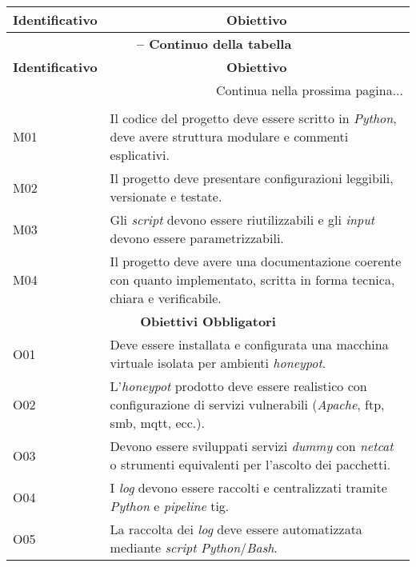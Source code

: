 \begin{center}
\begin{longtable}{|p{}|p{}|}
\hline
\multicolumn{1}{|c|}{\textbf{Identificativo}} & \multicolumn{1}{c|}{\textbf{Obiettivo}}\\ 
\hline 
\endfirsthead
\multicolumn{2}{c}{{\bfseries \tablename\ \thetable{} -- Continuo della tabella}}\\
\hline
\multicolumn{1}{|c|}{\textbf{Identificativo}} & \multicolumn{1}{c|}{\textbf{Obiettivo}}\\ \hline 
\endhead
\hline
\multicolumn{2}{|r|}{{Continua nella prossima pagina...}}\\
\hline
\endfoot
\endlastfoot 

\multicolumn{2}{|c|}{\textbf{Obiettivi Minimi}} \\ \hline
M01 & Il codice del progetto deve essere scritto in \textit{Python}, deve avere struttura modulare e commenti esplicativi. \\ \hline
M02 & Il progetto deve presentare configurazioni leggibili, versionate e testate. \\ \hline
M03 & Gli \textit{script} devono essere riutilizzabili e gli \textit{input} devono essere parametrizzabili. \\ \hline
M04 & Il progetto deve avere una documentazione coerente con quanto implementato, scritta in forma tecnica, chiara e verificabile. \\ \hline

\multicolumn{2}{|c|}{\textbf{Obiettivi Obbligatori}} \\ \hline
O01 & Deve essere installata e configurata una macchina virtuale isolata per ambienti \textit{honeypot}. \\ \hline
O02 & L'\textit{honeypot} prodotto deve essere realistico con configurazione di servizi vulnerabili (\textit{Apache}, \gls{ftp}\glsadd{ftp_def}, \gls{smb}\glsadd{smb_def}, \gls{mqtt}, ecc.). \\ \hline
O03 & Devono essere sviluppati servizi \textit{dummy} con \textit{netcat} o strumenti equivalenti per l'ascolto dei pacchetti. \\ \hline
O04 & I \textit{log} devono essere raccolti e centralizzati tramite \textit{Python} e \textit{pipeline} \gls{tig}. \\ \hline
O05 & La raccolta dei \textit{log} deve essere automatizzata mediante \textit{script} \textit{Python}/\textit{Bash}. \\ \hline


\end{longtable}
\end{center}
